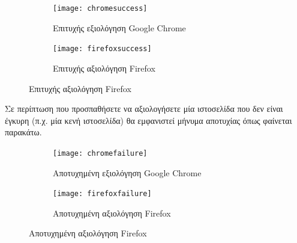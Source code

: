 \documentclass{article}
\begin{document}
\begin{figure}[H]
    \centering
    \begin{minipage}[t]{0.45\textwidth}
        \centering
        \begin{subfigure}[t]{\textwidth}
            \texttt{[image: chromesuccess]}
        \caption{Επιτυχής εξιολόγηση Google Chrome}
        \label{Fig:chromesuccess}
        \end{subfigure}
        \vspace{\fill}
    \end{minipage}
    \hfill
    \begin{minipage}[t]{0.45\textwidth}
        \centering
        \begin{subfigure}[t]{\textwidth}
            \texttt{[image: firefoxsuccess]}
            \caption{Επιτυχής αξιολόγηση Firefox}
            \label{Fig:firefoxsuccess}
        \end{subfigure}
    \end{minipage}
\end{figure}

Σε περίπτωση που προσπαθήσετε να αξιολογήσετε μία ιστοσελίδα που δεν είναι έγκυρη (π.χ. μία κενή ιστοσελίδα) θα εμφανιστεί μήνυμα αποτυχίας όπως φαίνεται παρακάτω.

\begin{figure}[H]
    \centering
    \begin{minipage}[t]{0.45\textwidth}
        \centering
        \begin{subfigure}[t]{\textwidth}
            \texttt{[image: chromefailure]}
        \caption{Αποτυχημένη εξιολόγηση Google Chrome}
        \label{Fig:chromefailure}
        \end{subfigure}
        \vspace{\fill}
    \end{minipage}
    \hfill
    \begin{minipage}[t]{0.45\textwidth}
        \centering
        \begin{subfigure}[t]{\textwidth}
            \texttt{[image: firefoxfailure]}
            \caption{Αποτυχημένη αξιολόγηση Firefox}
            \label{Fig:firefoxfailure}
        \end{subfigure}
    \end{minipage}
\end{figure}
\end{document}
